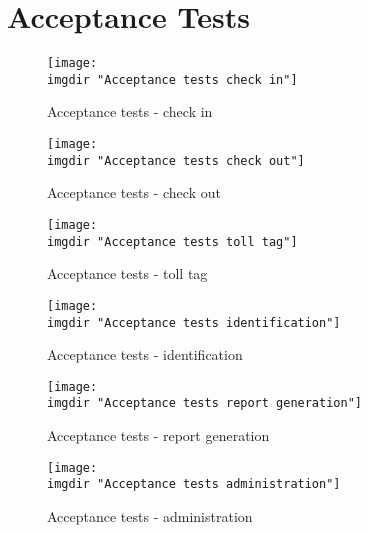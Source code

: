 \chapter{Acceptance Tests}
\begin{figure}
\texttt{[image: \\imgdir "Acceptance tests check in"]}
\centering
\caption{Acceptance tests - check in}
\label{fig:acceptance_tests_check_in}
\end{figure}

\begin{figure}
\texttt{[image: \\imgdir "Acceptance tests check out"]}
\centering
\caption{Acceptance tests - check out}
\label{fig:acceptance_tests_check_out}
\end{figure}

\begin{figure}
\texttt{[image: \\imgdir "Acceptance tests toll tag"]}
\centering
\caption{Acceptance tests - toll tag}
\label{fig:acceptance_tests_toll_tag}
\end{figure}

\begin{figure}
\texttt{[image: \\imgdir "Acceptance tests identification"]}
\centering
\caption{Acceptance tests - identification}
\label{fig:acceptance_tests_identification}
\end{figure}

\begin{figure}
\texttt{[image: \\imgdir "Acceptance tests report generation"]}
\centering
\caption{Acceptance tests - report generation}
\label{fig:acceptance_tests_report_generation}
\end{figure}

\begin{figure}
\texttt{[image: \\imgdir "Acceptance tests administration"]}
\centering
\caption{Acceptance tests - administration}
\label{fig:acceptance_tests_administration}
\end{figure}